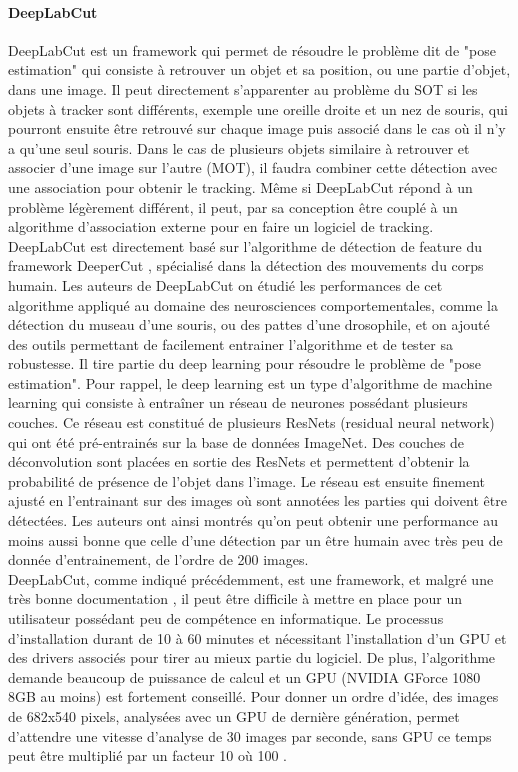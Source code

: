   \paragraph{DeepLabCut}
  DeepLabCut \cite{mathis2018deeplabcut} est un framework qui permet de résoudre le problème dit de "pose estimation" qui consiste à retrouver un objet et sa position, ou une partie d'objet, dans une image. Il peut directement s'apparenter au problème du SOT si les objets à tracker sont différents, exemple une oreille droite et un nez de souris, qui pourront ensuite être retrouvé sur chaque image puis associé dans le cas où il n'y a qu'une seul souris. Dans le cas de plusieurs objets similaire à retrouver et associer d'une image sur l'autre (MOT), il faudra combiner cette détection avec une association pour obtenir le tracking. Même si DeepLabCut répond à un problème légèrement différent, il peut, par sa conception être couplé à un algorithme d'association externe pour en faire un logiciel de tracking.\\
  DeepLabCut est directement basé sur l'algorithme de détection de feature du framework DeeperCut \cite{insafutdinov2016deepercut}, spécialisé dans la détection des mouvements du corps humain. Les auteurs de DeepLabCut on étudié les performances de cet algorithme appliqué au domaine des neurosciences comportementales, comme la détection du museau d'une souris, ou des pattes d'une drosophile, et on ajouté des outils permettant de facilement entrainer l’algorithme et de tester sa robustesse. Il tire partie du deep learning pour résoudre le problème de "pose estimation". Pour rappel, le deep learning est un type d'algorithme de machine learning qui consiste à entraîner un réseau de neurones possédant plusieurs couches. Ce réseau est constitué de plusieurs ResNets (residual neural network) qui ont été pré-entrainés sur la base de données ImageNet. Des couches de déconvolution sont placées en sortie des ResNets et permettent d'obtenir la probabilité de présence de l'objet dans l'image. Le réseau est ensuite finement ajusté en l’entrainant sur des images où sont annotées les parties qui doivent être détectées. Les auteurs ont ainsi montrés qu'on peut obtenir une performance au moins aussi bonne que celle d'une détection par un être humain avec très peu de donnée d’entrainement, de l'ordre de 200 images.\\
  DeepLabCut, comme indiqué précédemment, est une framework, et malgré une très bonne documentation \cite{nath2019using}, il peut être difficile à mettre en place pour un utilisateur possédant peu de compétence en informatique. Le processus d'installation durant de 10 à 60 minutes et nécessitant l'installation d'un GPU et des drivers associés pour tirer au mieux partie du logiciel. De plus, l'algorithme demande beaucoup de puissance de calcul et un GPU (NVIDIA GForce 1080 8GB au moins) est fortement conseillé. Pour donner un ordre d'idée, des images de 682x540 pixels, analysées avec un GPU de dernière génération, permet d'attendre une vitesse d'analyse de 30 images par seconde, sans GPU ce temps peut être multiplié par un facteur 10 où 100 \cite{mathis2018inference}.\\
